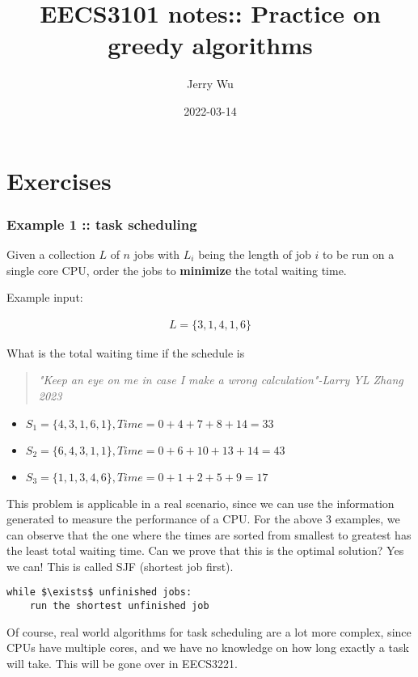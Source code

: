 \documentclass[12pt]{book}
\title{EECS3101 notes:: Practice on greedy algorithms}
\author{Jerry Wu}
\date{2022-03-14}
\begin{document}
\maketitle

\chapter*{Exercises}

\subsection*{Example 1 :: task scheduling}

Given a collection $L$ of $n$ jobs with $L_i$ being the length of job $i$ to be run on a single core CPU, order the jobs to \textbf{minimize} the total waiting time.

Example input:

\begin{align*}
    L=\{3,1,4,1,6\}
\end{align*}

What is the total waiting time if the schedule is

\begin{quote}
    \textit{"Keep an eye on me in case I make a wrong calculation"-Larry YL Zhang 2023}
\end{quote}

\begin{itemize}
    \item $S_1=\{4,3,1,6,1\}, Time=0+4+7+8+14=33$
    \item $S_2=\{6,4,3,1,1\}, Time=0+6+10+13+14=43$
    \item $S_3=\{1,1,3,4,6\}, Time=0+1+2+5+9=17$
\end{itemize}

This problem is applicable in a real scenario, since we can use the information generated to measure the performance of a CPU. For the above 3 examples, we can observe that the one where the times are sorted from smallest to greatest has the least total waiting time. Can we prove that this is the optimal solution? Yes we can! This is called SJF (shortest job first).

\begin{lstlisting}
while $\exists$ unfinished jobs:
    run the shortest unfinished job
\end{lstlisting}

Of course, real world algorithms for task scheduling are a lot more complex, since CPUs have multiple cores, and we have no knowledge on how long exactly a task will take. This will be gone over in EECS3221.
\end{document}
